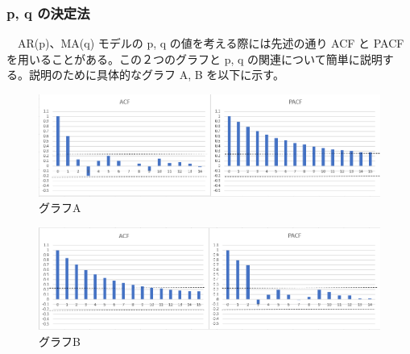 \documentclass[dvipdfmx]{scrartcl}
\begin{document}
\subsubsection{p, q の決定法}
\label{sec:org1622575}
　AR(p)、MA(q) モデルの p, q の値を考える際には先述の通り ACF と PACF を用いることがある。この２つのグラフと p, q の関連について簡単に説明する。説明のために具体的なグラフ A, B を以下に示す。\\
\begin{figure}[htbp]
\centering
\includegraphics[width=16cm]{./acf-pacf.PNG}
\caption{グラフA}
\end{figure}

\begin{figure}[htbp]
\centering
\includegraphics[width=16cm]{./pacf-acf.PNG}
\caption{グラフB}
\end{figure}
\end{document}
